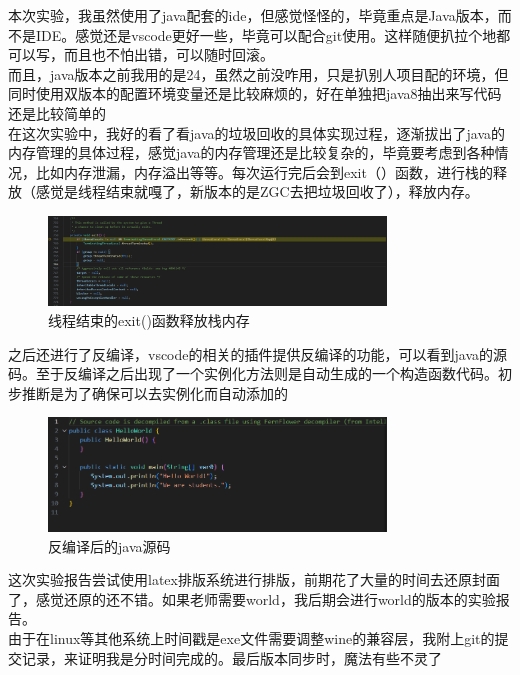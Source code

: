 \documentclass[12pt,a4paper]{article}
\begin{document}
本次实验，我虽然使用了java配套的ide，但感觉怪怪的，毕竟重点是Java版本，而不是IDE。感觉还是vscode更好一些，毕竟可以配合git使用。这样随便扒拉个地都可以写，而且也不怕出错，可以随时回滚。\\
而且，java版本之前我用的是24，虽然之前没咋用，只是扒别人项目配的环境，但同时使用双版本的配置环境变量还是比较麻烦的，好在单独把java8抽出来写代码还是比较简单的\\
在这次实验中，我好的看了看java的垃圾回收的具体实现过程，逐渐拔出了java的内存管理的具体过程，感觉java的内存管理还是比较复杂的，毕竟要考虑到各种情况，比如内存泄漏，内存溢出等等。每次运行完后会到exit（）函数，进行栈的释放（感觉是线程结束就嘎了，新版本的是ZGC去把垃圾回收了），释放内存。\\
    \begin{figure}[H]
    \centering
    \includegraphics[width=0.8\textwidth]{thread.png}
    \caption{线程结束的exit()函数释放栈内存}
    \end{figure}
之后还进行了反编译，vscode的相关的插件提供反编译的功能，可以看到java的源码。至于反编译之后出现了一个实例化方法则是自动生成的一个构造函数代码。初步推断是为了确保可以去实例化而自动添加的
    \begin{figure}[H]
    \centering
    \includegraphics[width=0.8\textwidth]{fanbianyi1.png}
    \caption{反编译后的java源码}
    \end{figure}
这次实验报告尝试使用latex排版系统进行排版，前期花了大量的时间去还原封面了，感觉还原的还不错。如果老师需要world，我后期会进行world的版本的实验报告。\\
由于在linux等其他系统上时间戳是exe文件需要调整wine的兼容层，我附上git的提交记录，来证明我是分时间完成的。最后版本同步时，魔法有些不灵了
\end{document}
